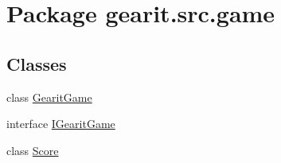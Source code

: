 \hypertarget{namespacegearit_1_1src_1_1game}{\section{Package gearit.\+src.\+game}
\label{namespacegearit_1_1src_1_1game}
}
\subsection*{Classes}
\begin{DoxyCompactItemize}
\item 
class \hyperlink{classgearit_1_1src_1_1game_1_1_gearit_game}{Gearit\+Game}
\item 
interface \hyperlink{interfacegearit_1_1src_1_1game_1_1_i_gearit_game}{I\+Gearit\+Game}
\item 
class \hyperlink{classgearit_1_1src_1_1game_1_1_score}{Score}
\end{DoxyCompactItemize}
